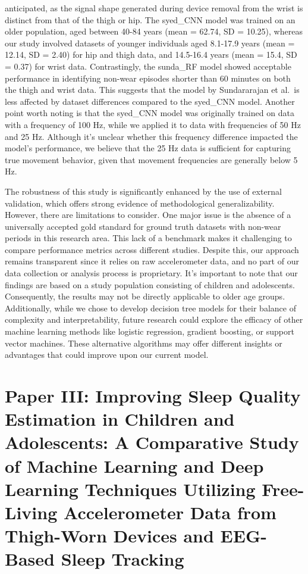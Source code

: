 \documentclass[
  10pt,
]{scrbook}
\begin{document}
anticipated, as the signal shape generated during device removal from
the wrist is distinct from that of the thigh or hip. The
\textsf{syed\_CNN} model was trained on an older population, aged
between 40-84 years (mean = 62.74, SD = 10.25), whereas our study
involved datasets of younger individuals aged 8.1-17.9 years (mean =
12.14, SD = 2.40) for hip and thigh data, and 14.5-16.4 years (mean =
15.4, SD = 0.37) for wrist data. Contrastingly, the \textsf{sunda\_RF}
model showed acceptable performance in identifying non-wear episodes
shorter than 60 minutes on both the thigh and wrist data. This suggests
that the model by Sundararajan et al.~is less affected by dataset
differences compared to the \textsf{syed\_CNN} model. Another point
worth noting is that the \textsf{syed\_CNN} model was originally trained
on data with a frequency of 100 Hz, while we applied it to data with
frequencies of 50 Hz and 25 Hz. Although it's unclear whether this
frequency difference impacted the model's performance, we believe that
the 25 Hz data is sufficient for capturing true movement behavior, given
that movement frequencies are generally below 5 Hz.

The robustness of this study is significantly enhanced by the use of
external validation, which offers strong evidence of methodological
generalizability. However, there are limitations to consider. One major
issue is the absence of a universally accepted gold standard for ground
truth datasets with non-wear periods in this research area. This lack of
a benchmark makes it challenging to compare performance metrics across
different studies. Despite this, our approach remains transparent since
it relies on raw accelerometer data, and no part of our data collection
or analysis process is proprietary. It's important to note that our
findings are based on a study population consisting of children and
adolescents. Consequently, the results may not be directly applicable to
older age groups. Additionally, while we chose to develop decision tree
models for their balance of complexity and interpretability, future
research could explore the efficacy of other machine learning methods
like logistic regression, gradient boosting, or support vector machines.
These alternative algorithms may offer different insights or advantages
that could improve upon our current model.

\hypertarget{paper-iii-improving-sleep-quality-estimation-in-children-and-adolescents-a-comparative-study-of-machine-learning-and-deep-learning-techniques-utilizing-free-living-accelerometer-data-from-thigh-worn-devices-and-eeg-based-sleep-tracking}{%
\chapter{Paper III: Improving Sleep Quality Estimation in Children and
Adolescents: A Comparative Study of Machine Learning and Deep Learning
Techniques Utilizing Free-Living Accelerometer Data from Thigh-Worn
Devices and EEG-Based Sleep
Tracking}\label{paper-iii-improving-sleep-quality-estimation-in-children-and-adolescents-a-comparative-study-of-machine-learning-and-deep-learning-techniques-utilizing-free-living-accelerometer-data-from-thigh-worn-devices-and-eeg-based-sleep-tracking}}
\end{document}
